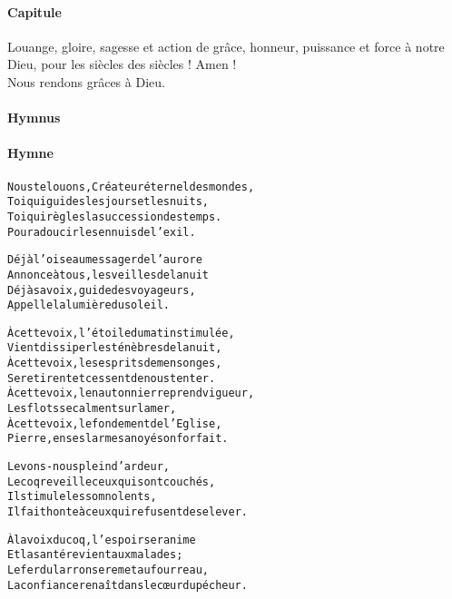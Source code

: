 \documentclass[twoside]{article}
\begin{document}
\begin{paracol}[1]{2}
\paragraph{Capitule}
 \capsaut Louange, gloire, sagesse et action de grâce, honneur, puissance et force à notre Dieu, pour les siècles des siècles ! Amen !\\
\rr Nous rendons grâces à Dieu.

\switchcolumn*

\paragraph{Hymnus}


\switchcolumn

\paragraph{Hymne}
\begin{alltt}\normalfont




             
             Nous te louons, Créateur éternel des mondes,
             Toi qui guides les jours et les nuits,
             Toi qui règles la succession des temps.
             Pour adoucir les ennuis de l'exil.
             
             Déjà l'oiseau messager de l'aurore
             Annonce à tous, les veilles de la nuit
             Déjà sa voix, guide des voyageurs,
             Appelle la lumière du soleil.
             
             À cette voix, l'étoile du matin stimulée,
             Vient dissiper les ténèbres de la nuit,
             À cette voix, les esprits de mensonges,
             Se retirent et cessent de nous tenter.
\newpage             
             À cette voix, le nautonnier reprend vigueur,
             Les flots se calment sur la mer,
             À cette voix, le fondement de l'Eglise,
             Pierre, en ses larmes a noyé son forfait.
             
             Levons-nous plein d'ardeur,
             Le coq reveille ceux qui sont couchés,
             Il stimule les somnolents,
             Il fait honte à ceux qui refusent de se lever.
             
             À la voix du coq, l'espoir se ranime
             Et la santé revient aux malades ;
             Le fer du larron se remet au fourreau,
             La confiance renaît dans le cœur du pécheur.
             

\end{alltt}
\end{paracol}
\end{document}
